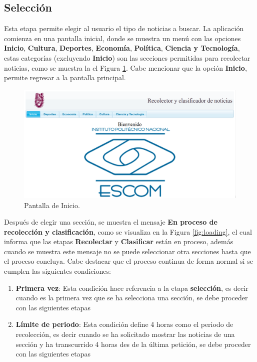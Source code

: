 \subsection{Selección}


Esta etapa permite elegir al usuario el tipo de noticias a buscar. La aplicación comienza en una pantalla inicial, donde se muestra un menú con las opciones \textbf{Inicio}, \textbf{Cultura}, \textbf{Deportes}, \textbf{Economía}, \textbf{Política}, \textbf{Ciencia y Tecnología}, estas categorías (excluyendo \textbf{Inicio}) son las secciones permitidas para recolectar noticias, como se muestra la el Figura \ref{fig:PantallaInicio}. Cabe mencionar que la opción \textbf{Inicio}, permite regresar a la pantalla principal.\\


\begin{figure}[H]
\centering
\includegraphics[scale=0.29]{imagenes/Capitulo5/pantallaPrincipal.png}
\caption{Pantalla de Inicio.}
\label{fig:PantallaInicio}
\end{figure}

Después de elegir una sección, se muestra el mensaje \textbf{En proceso de recolección y clasificación}, como se visualiza en la Figura \ref{fig:loading}, el cual informa que las etapas \textbf{Recolectar} y \textbf{Clasificar} están en proceso, además cuando se muestra este mensaje no se puede seleccionar otra secciones hasta que el proceso concluya. Cabe destacar que el proceso continua de forma normal si se cumplen las siguientes condiciones:

\begin{enumerate}
	\item \textbf{Primera vez}: Esta condición hace referencia a la etapa \textbf{selección}, es decir cuando es la primera vez que se ha selecciona una sección, se debe proceder con las siguientes etapas

	\item \textbf{Límite de periodo}: Esta condición define 4 horas como el periodo de recolección, es decir cuando se ha solicitado mostrar las noticias de una sección y ha transcurrido 4 horas des de la última petición, se debe proceder con las siguientes etapas
\end{enumerate}	

